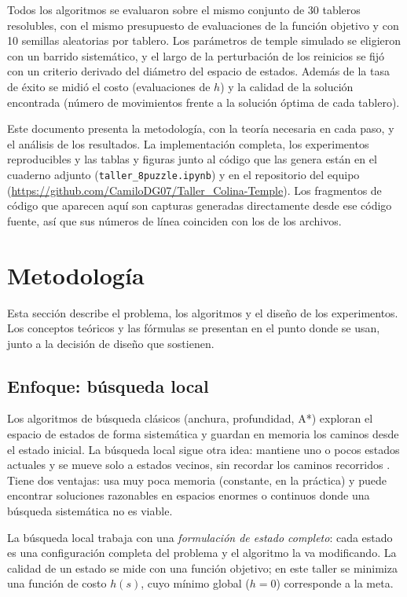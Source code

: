 \documentclass[12pt,a4paper]{article}
\begin{document}
Todos los algoritmos se evaluaron sobre el mismo conjunto de 30
tableros resolubles, con el mismo presupuesto de evaluaciones de la
función objetivo y con 10 semillas aleatorias por tablero. Los
parámetros de temple simulado se eligieron con un barrido
sistemático, y el largo de la perturbación de los reinicios se fijó
con un criterio derivado del diámetro del espacio de estados. Además
de la tasa de éxito se midió el costo (evaluaciones de $h$) y la
calidad de la solución encontrada (número de movimientos frente a la
solución óptima de cada tablero).

Este documento presenta la metodología, con la teoría necesaria en cada
paso, y el análisis de los resultados. La implementación completa, los experimentos
reproducibles y las tablas y figuras junto al código que las genera
están en el cuaderno adjunto (\nolinkurl{taller_8puzzle.ipynb}) y en el
repositorio del equipo
(\url{https://github.com/CamiloDG07/Taller_Colina-Temple}). Los
fragmentos de código que aparecen aquí son capturas generadas
directamente desde ese código fuente, así que sus números de línea
coinciden con los de los archivos.

\section{Metodología}

Esta sección describe el problema, los algoritmos y el diseño de los
experimentos. Los conceptos teóricos y las fórmulas se presentan en el
punto donde se usan, junto a la decisión de diseño que sostienen.

\subsection{Enfoque: búsqueda local}

Los algoritmos de búsqueda clásicos (anchura, profundidad, A*) exploran
el espacio de estados de forma sistemática y guardan en memoria los
caminos desde el estado inicial. La búsqueda local sigue otra idea:
mantiene uno o pocos estados actuales y se mueve solo a estados
vecinos, sin recordar los caminos recorridos \cite{russell2021}. Tiene
dos ventajas: usa muy poca memoria (constante, en la práctica) y puede
encontrar soluciones razonables en espacios enormes o continuos donde
una búsqueda sistemática no es viable.

La búsqueda local trabaja con una \emph{formulación de estado completo}:
cada estado es una configuración completa del problema y el algoritmo
la va modificando. La calidad de un estado se mide con una función
objetivo; en este taller se minimiza una función de costo $h(s)$, cuyo
mínimo global ($h = 0$) corresponde a la meta.
\end{document}
